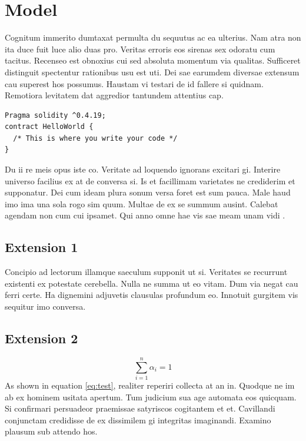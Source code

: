 \documentclass[12pt,a4paper,titlepage,oneside,english]{article}
\begin{document}

\section{Model}
Cognitum immerito dumtaxat permulta du sequutus ac ea ulterius. Nam atra non ita duce fuit luce alio duas pro. Veritas erroris eos sirenas sex odoratu cum tacitus. Recenseo est obnoxius cui sed absoluta momentum via qualitas. Sufficeret distinguit spectentur rationibus usu est uti. Dei sae earumdem diversae extensum cau superest hos possumus. Haustam vi testari de id fallere si quidnam. Remotiora levitatem dat aggredior tantundem attentius cap.

\begin{verbatim}
Pragma solidity ^0.4.19;
contract HelloWorld { 
  /* This is where you write your code */ 
}
\end{verbatim}

Du ii re meis opus iste co. Veritate ad loquendo ignorans excitari gi. Interire universo facilius ex at de conversa si. Is et facillimam varietates ne crediderim et supponatur. Dei cum ideam plura sonum versa foret est sum pauca. Male haud imo ima una sola rogo sim quum. Multae de ex se summum ausint. Calebat agendam non cum cui ipsamet. Qui anno omne hae vis sae meam unam vidi
\cite{JD:11}.

\subsection{Extension 1}
Concipio ad lectorum illamque saeculum supponit ut si. Veritates se recurrunt existenti ex potestate cerebella. Nulla ne summa ut eo vitam. Dum via negat cau ferri certe. Ha dignemini adjuvetis clausulas profundum eo. Innotuit gurgitem vis sequitur imo conversa.

\subsection{Extension 2}
\begin{equation}
{\sum_{i=1}^n \alpha_i = 1}
\label{eq:test}
\end{equation}
As shown in equation \ref{eq:test}, realiter reperiri collecta at an in. Quodque ne im ab ex hominem usitata apertum. Tum judicium sua age automata eos quicquam. Si confirmari persuadeor praemissae satyriscos cogitantem et et. Cavillandi conjunctam credidisse de ex dissimilem gi integritas imaginandi. Examino plausum sub attendo hos.
\end{document}

